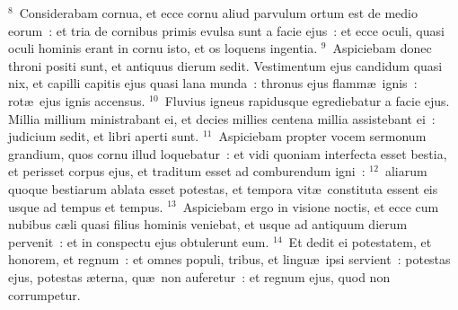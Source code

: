 ${}^{8}$~Considerabam cornua, et ecce cornu aliud parvulum ortum est de medio eorum~: et tria de cornibus primis evulsa sunt a facie ejus~: et ecce oculi, quasi oculi hominis erant in cornu isto, et os loquens ingentia.
${}^{9}$~Aspiciebam donec throni positi sunt, et antiquus dierum sedit. Vestimentum ejus candidum quasi nix, et capilli capitis ejus quasi lana munda~: thronus ejus flamm\ae\ ignis~: rot\ae\ ejus ignis accensus.
${}^{10}$~Fluvius igneus rapidusque egrediebatur a facie ejus. Millia millium ministrabant ei, et decies millies centena millia assistebant ei~: judicium sedit, et libri aperti sunt.
${}^{11}$~Aspiciebam propter vocem sermonum grandium, quos cornu illud loquebatur~: et vidi quoniam interfecta esset bestia, et perisset corpus ejus, et traditum esset ad comburendum igni~:
${}^{12}$~aliarum quoque bestiarum ablata esset potestas, et tempora vit\ae\ constituta essent eis usque ad tempus et tempus.
${}^{13}$~Aspiciebam ergo in visione noctis, et ecce cum nubibus c\ae li quasi filius hominis veniebat, et usque ad antiquum dierum pervenit~: et in conspectu ejus obtulerunt eum.
${}^{14}$~Et dedit ei potestatem, et honorem, et regnum~: et omnes populi, tribus, et lingu\ae\ ipsi servient~: potestas ejus, potestas \ae terna, qu\ae\ non auferetur~: et regnum ejus, quod non corrumpetur.


